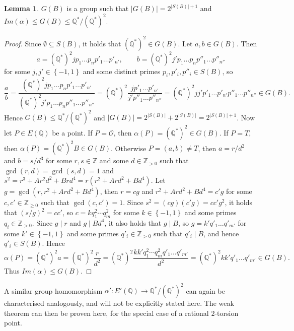 \documentclass{article}
\newcommand{\Z}{\mathbb{Z}}
\newcommand{\Q}{\mathbb{Q}}
\newcommand{\rb}[1]{\left( #1 \right)}
\newcommand{\cb}[1]{\left\{ #1 \right\}}
\newcommand{\abs}[1]{\left\lvert #1 \right\rvert}
\theoremstyle{definition}\newtheorem*{definition}{Definition}
\theoremstyle{definition}\newtheorem*{example}{Example}
\theoremstyle{definition}\newtheorem*{remark}{Remark}
\newtheorem{lemma}[proposition]{Lemma}
\begin{document}
\begin{lemma}
$ G\rb{B} $ is a group such that $ \abs{G\rb{B}} = 2^{\abs{S\rb{B}} + 1} $ and $ Im\rb{\alpha} \le G\rb{B} \le \Q^* / \rb{\Q^*}^2 $.
\end{lemma}

\begin{proof}
Since $ \emptyset \subseteq S\rb{B} $, it holds that $ \rb{\Q^*}^2 \in G\rb{B} $. Let $ a, b \in G\rb{B} $. Then
$$ a = \rb{\Q^*}^2 j p_1 \dots p_n p'_1 \dots p'_{n'}, \qquad b = \rb{\Q^*}^2 j' p_1 \dots p_n p''_1 \dots p''_{n''} $$
for some $ j, j' \in \cb{-1, 1} $ and some distinct primes $ p_i, p'_i, p''_i \in S\rb{B} $, so
$$ \dfrac{a}{b} = \dfrac{\rb{\Q^*}^2 j p_1 \dots p_n p'_1 \dots p'_{n'}}{\rb{\Q^*}^2 j' p_1 \dots p_n p''_1 \dots p''_{n''}} = \rb{\Q^*}^2\dfrac{j p'_1 \dots p'_{n'}}{j' p''_1 \dots p''_{n''}} = \rb{\Q^*}^2 j j' p'_1 \dots p'_{n'} p''_1 \dots p''_{n''} \in G\rb{B}. $$
Hence $ G\rb{B} \le \Q^* / \rb{\Q^*}^2 $ and $ \abs{G\rb{B}} = 2^{\abs{S\rb{B}}} + 2^{\abs{S\rb{B}}} = 2^{\abs{S\rb{B}} + 1} $. Now let $ P \in E\rb{\Q} $ be a point. If $ P = \mathcal{O} $, then $ \alpha\rb{P} = \rb{\Q^*}^2 \in G\rb{B} $. If $ P = T $, then $ \alpha\rb{P} = \rb{\Q^*}^2B \in G\rb{B} $. Otherwise $ P = \rb{a, b} \ne T $, then $ a = r / d^2 $ and $ b = s / d^3 $ for some $ r, s \in \Z $ and some $ d \in \Z_{> 0} $ such that $ \gcd\rb{r, d} = \gcd\rb{s, d} = 1 $ and $ s^2 = r^3 + Ar^2d^2 + Brd^4 = r\rb{r^2 + Ard^2 + Bd^4} $. Let $ g = \gcd\rb{r, r^2 + Ard^2 + Bd^4} $, then $ r = cg $ and $ r^2 + Ard^2 + Bd^4 = c'g $ for some $ c, c' \in \Z_{\ge 0} $ such that $ \gcd\rb{c, c'} = 1 $. Since $ s^2 = \rb{cg}\rb{c'g} = cc'g^2 $, it holds that $ \rb{s / g}^2 = cc' $, so $ c = k q_1^2 \cdots q_m^2 $ for some $ k \in \cb{-1, 1} $ and some primes $ q_i \in \Z_{> 0} $. Since $ g \mid r $ and $ g \mid Bd^4 $, it also holds that $ g \mid B $, so $ g = k' q'_1 \dots q'_{m'} $ for some $ k' \in \cb{-1, 1} $ and some primes $ q'_i \in \Z_{> 0} $ such that $ q'_i \mid B $, and hence $ q'_i \in S\rb{B} $. Hence
$$ \alpha\rb{P} = \rb{\Q^*}^2a = \rb{\Q^*}^2\dfrac{r}{d^2} = \rb{\Q^*}^2\dfrac{k k' q_1^2 \cdots q_m^2 q'_1 \dots q'_{m'}}{d^2} = \rb{\Q^*}^2 k k' q'_1 \dots q'_{m'} \in G\rb{B}. $$
Thus $ Im\rb{\alpha} \le G\rb{B} $.
\end{proof}

A similar group homomorphism $ \alpha' : E'\rb{\Q} \to \Q^* / \rb{\Q^*}^2 $ can again be characterised analogously, and will not be explicitly stated here. The weak theorem can then be proven here, for the special case of a rational $ 2 $-torsion point.
\end{document}
